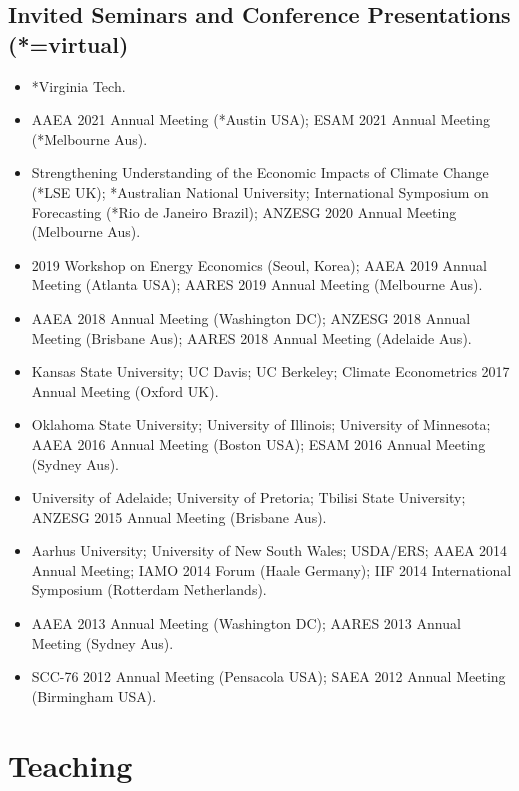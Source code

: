\documentclass[10pt]{article}
\begin{document}
	\subsection*{Invited Seminars and Conference Presentations (*=virtual)}
	\begin{itemize}
		\item {} *Virginia Tech.
		\item {} AAEA 2021 Annual Meeting (*Austin USA); ESAM 2021 Annual Meeting (*Melbourne Aus).
		\item {} Strengthening Understanding of the Economic Impacts of Climate Change (*LSE UK); *Australian National University; International Symposium on Forecasting (*Rio de Janeiro Brazil); ANZESG 2020 Annual Meeting (Melbourne Aus).
		\item {} 2019 Workshop on Energy Economics (Seoul, Korea); AAEA 2019 Annual Meeting (Atlanta USA); AARES 2019 Annual Meeting (Melbourne Aus).
		\item {} AAEA 2018 Annual Meeting (Washington DC); ANZESG 2018 Annual Meeting (Brisbane Aus); AARES 2018 Annual Meeting (Adelaide Aus).
		\item {} Kansas State University; UC Davis; UC Berkeley; Climate Econometrics 2017 Annual Meeting (Oxford UK).
		\item {} Oklahoma State University; University of Illinois; University of Minnesota; AAEA 2016 Annual Meeting (Boston USA); ESAM 2016 Annual Meeting (Sydney Aus).
		\item {} University of Adelaide; University of Pretoria; Tbilisi State University; ANZESG 2015 Annual Meeting (Brisbane Aus).
		\item {} Aarhus University; University of New South Wales; USDA/ERS; AAEA 2014 Annual Meeting; IAMO 2014 Forum (Haale Germany); IIF 2014 International Symposium (Rotterdam Netherlands).
		\item {} AAEA 2013 Annual Meeting (Washington DC); AARES 2013 Annual Meeting (Sydney Aus).
		\item {} SCC-76 2012 Annual Meeting (Pensacola USA); SAEA 2012 Annual Meeting (Birmingham USA).
	\end{itemize}
	
	\bigskip
	
	\section*{Teaching}
	
\end{document}
